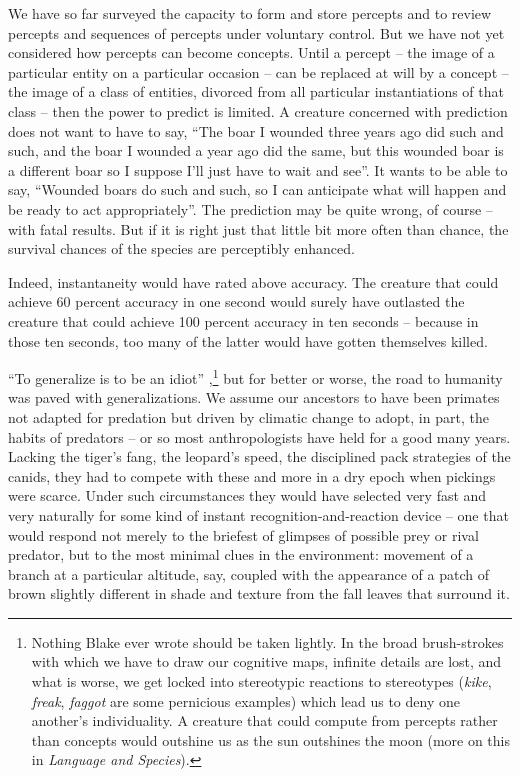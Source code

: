 We have so far surveyed the capacity to form and store percepts and to review percepts and sequences of percepts under voluntary
control. But we have not yet considered how percepts can become concepts. Until a percept -- the image of a particular entity on a particular occasion -- can be replaced at will by a concept -- the image of a class of entities, divorced from all particular instantiations of that class -- then the power to predict is limited. A creature concerned with prediction does not want to have to say, ``The boar I wounded three years ago did such and such, and the boar I wounded a year ago did the same, but this wounded boar is a different boar so I suppose I'll just have to wait and see''. It wants to be able to say, ``Wounded boars do such and such, so I can anticipate what will happen and be ready to act appropriately''. The prediction may be quite wrong, of course -- with fatal results. But if it is right just that little bit more often than chance, the survival chances of the species are perceptibly enhanced.

Indeed, instantaneity would have rated above accuracy. The creature that could achieve 60 percent accuracy in one second would surely have outlasted the creature that could achieve 100 percent accuracy in ten seconds -- because in those ten seconds, too many of the latter would have gotten themselves killed.

``To generalize is to be an idiot'' \citep{Blake1808},\footnote{Nothing Blake ever wrote should be taken lightly. In the broad brush-strokes with which we have to draw our cognitive maps, infinite details are lost, and what is worse, we get locked into stereotypic reactions to stereotypes (\textit{kike}, \textit{freak}, \textit{faggot} are some pernicious examples) which lead us to deny one another's individuality. A creature that could compute from percepts rather than concepts would outshine us as the sun outshines the moon (more on this in \textit{Language and Species}).} but for better or worse, the road to humanity was paved with generalizations. We assume our ancestors to have been primates not adapted for predation but driven by climatic change to adopt, in part, the habits of predators -- or so most anthropologists have held for a good many years. Lacking the tiger's fang, the leopard's speed, the disciplined pack strategies of the canids, they had to compete with these and more in a dry epoch when pickings were scarce. Under such circumstances they would have selected very fast and very naturally for some kind of instant recognition-and-reaction device -- one that would respond not merely to the briefest of glimpses of possible prey or rival predator, but to the most minimal clues in the environment: movement of a branch at a particular altitude, say, coupled with the appearance of a patch of brown slightly different in shade and texture from the fall leaves that surround it.

